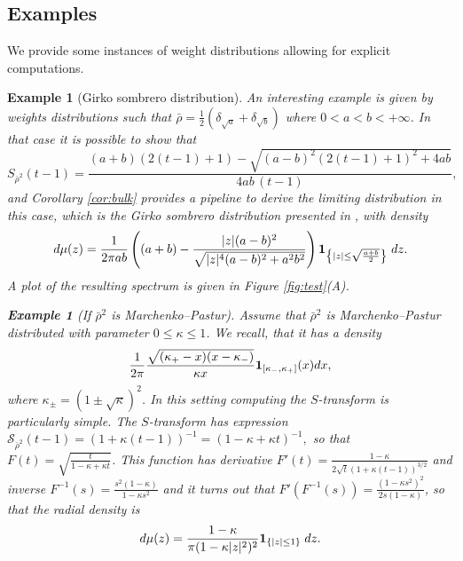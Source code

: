 \documentclass[11pt,oneside]{amsart}
\theoremstyle{plain}
\newtheorem{example}[theorem]{Example}
\numberwithin{equation}{section}
\newcommand{\one}{\textup{\textbf{1}}}
\begin{document}
\subsection{Examples} We provide some instances of weight distributions allowing for explicit computations.
\begin{example}[Girko  sombrero distribution] \label{ex:sombrero} 
An interesting example is given by weights distributions such that $\bar \rho = \frac{1}{2}(\delta_{\sqrt{a}}+\delta_{\sqrt{{b}}})$ where $0<a<b<+\infty$. 
In that case it is possible to show that
\begin{equation}
S_{\bar \rho^2}(t-1)
=
\frac{(a+b)(2(t-1)+1)
-\sqrt{(a-b)^2(2(t-1)+1)^2+4ab}}
     {4ab\,(t-1)},
     \end{equation}
and Corollary \ref{cor:bulk} provides a pipeline to derive the limiting distribution in this case, which is the Girko  sombrero distribution presented in \cite[Section 26.12]{Girko-canonical}, with density
\begin{equation}
      d\mu(z)= 
    \frac{1}{2\pi ab}\left((a+b)-\frac{|z|(a-b)^2}{\sqrt{|z|^4(a-b)^2 + a^2b^2}}\right) \one_{\left\{|z|\le \sqrt{\frac{a+b}{2}}\right\}}\; dz.
\end{equation}
A plot of the resulting spectrum is given in Figure \ref{fig:test}(A).
\begin{example}[If $\bar \rho^2$ is Marchenko--Pastur]
Assume that $\bar \rho^2$ is Marchenko--Pastur distributed with parameter $0 \le \kappa \le 1$. We recall, that it has a density
\begin{equation}
         \frac1{2\pi} \frac{\sqrt{(\kappa_+-x)(x-\kappa_-)}}{\kappa x} \one_{[\kappa_-,\kappa_+]}(x)dx,
     \end{equation}
     where $\kappa_\pm = (1\pm \sqrt{\kappa})^2$. 
In this setting computing the $S$-transform is particularly simple.
    The $S$-transform has expression $\mathcal{S}_{\bar \rho^2}(t-1) = (1+\kappa (t-1))^{-1}=(1-\kappa +\kappa t)^{-1},$
    so that $F(t)=\sqrt{\tfrac{t}{1-\kappa +\kappa t}}$. This function has derivative $F'(t)= \frac{1-\kappa}{2\sqrt{t}(1+\kappa (t-1))^{3/2}}$ and inverse $F^{-1}(s)={\tfrac{s^2 (1-\kappa)}{1-\kappa s^2}}$ and it turns out that $F'(F^{-1}(s))= \frac{(1-\kappa s^2)^2}{2s(1-\kappa)}$, so that the radial density is
\begin{equation}
    d\mu(z)= 
    \frac{1-\kappa}{\pi (1-\kappa |z|^2)^2} \one_{\{|z| \le 1 \}} \; dz.
\end{equation}
\end{example}
\end{example}
\end{document}
